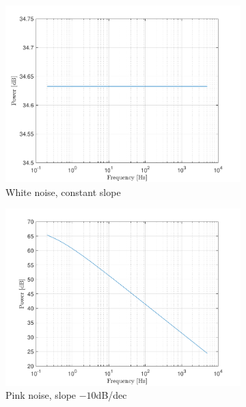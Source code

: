 \documentclass[10pt]{article}
\begin{document}
\begin{figure}[ht]
    \centering
    \begin{subfigure}[b]{0.31\textwidth}
        \includegraphics[width=\textwidth]{problem11_white_noise_power_spectrum_db.pdf}
        \caption{White noise, constant slope}
    \end{subfigure}
    \quad
    \begin{subfigure}[b]{0.31\textwidth}
        \includegraphics[width=\textwidth]{problem11_pink_noise_power_spectrum_db.pdf}
        \caption{Pink noise, slope $-10$dB/dec}
    \end{subfigure}
    \quad
    \begin{subfigure}[b]{0.31\textwidth}

\end{subfigure}
\end{figure}
\end{document}
